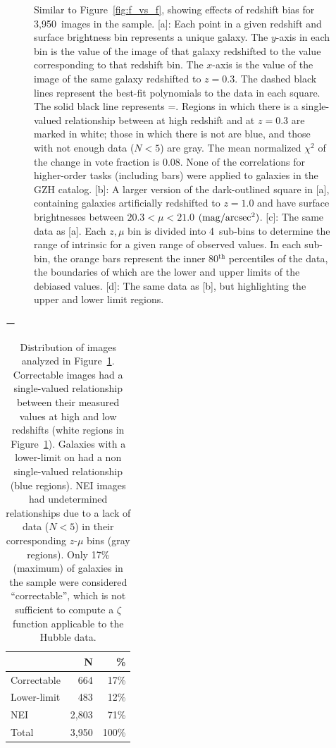 \documentclass[twocolumn]{aastex6}
\begin{document}
\begin{figure}
\caption{Similar to Figure~\ref{fig:f_vs_f}, showing effects of redshift bias
for 3,950~images in the \ferengi{} sample. [a]: Each point in a given redshift
and surface brightness bin represents a unique galaxy. The $y$-axis in each
bin is the \ffeatures{} value of the image of that galaxy redshifted to the
value corresponding to that redshift bin. The $x$-axis is the \ffeatures{}
value of the image of the same galaxy redshifted to $z=0.3$. The dashed
black lines represent the best-fit polynomials to the data in each square.
The solid black line represents \ffeaturesz=\ffeaturesrest. Regions in
which there is a single-valued relationship between \ffeatures{} at high
redshift and at $z=0.3$ are marked in white; those in which there is not
are blue, and those with not enough data ($N<5$) are gray. The mean
normalized $\chi^2$ of the change in vote fraction is 0.08. None of the
correlations for higher-order tasks (including bars) were applied to
galaxies in the GZH catalog. [b]: A larger version of the dark-outlined
square in [a], containing \ferengi{} galaxies artificially redshifted to
$z=1.0$ and have surface brightnesses between $20.3 < \mu < 21.0$ $\rm
(mag/arcsec^2)$. [c]: The same data as [a]. Each $z,\mu$ bin is divided
into 4~sub-bins to determine the range of intrinsic \ffeaturesrest{} for a
given range of observed \ffeaturesz{} values. In each sub-bin, the orange
bars represent the inner 80$^\mathrm{th}$ percentiles of the data, the
boundaries of which are the lower and upper limits of the debiased values.
[d]: The same data as [b], but highlighting the upper and lower limit
regions.}
\label{fig:f_vs_fbar}
\end{figure}

\begin{table}ー
\label{tbl:ferengi_bar}
\caption{Distribution of \ferengi{} images analyzed in
Figure~\ref{fig:f_vs_fbar}. Correctable images had a single-valued relationship
between their measured \fbar{} values at high and low redshifts (white regions
in Figure~\ref{fig:f_vs_fbar}). Galaxies with a lower-limit on \fbar{} had a
non single-valued relationship (blue regions). NEI images had undetermined
relationships due to a lack of data ($N<5$) in their corresponding $z$-$\mu$
bins (gray regions). Only 17\% (maximum) of \ferengi{} galaxies in the sample
were considered ``correctable'', which is not sufficient to compute a $\zeta$
function applicable to the Hubble data.   \label{tbl:ferengi_bar_corrections}}
\begin{tabular}{lrr}
\hline \hline
				                   & N       & \% \\
\hline 
Correctable                        & 664   & 17\% \\
Lower-limit                        & 483   & 12\% \\
NEI                                & 2,803     & 71\%\\
Total                              & 3,950   & 100\% \\
\hline \hline
\end{tabular}
\end{table}
\end{document}
